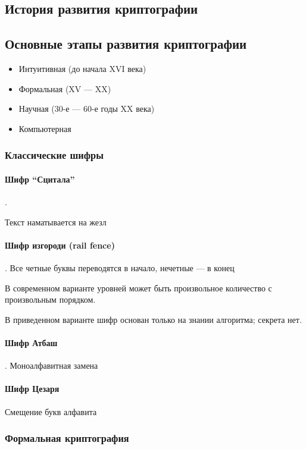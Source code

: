 \documentclass[a4paper, 14pt]{extarticle}
\begin{document}
\subsection{История развития криптографии}
\subsection{Основные этапы развития криптографии}
\begin{itemize}
    \item Интуитивная (до начала XVI века)
    \item Формальная (XV --- XX)
    \item Научная (30-е --- 60-е годы XX века)
    \item Компьютерная
\end{itemize}


\subsubsection{Классические шифры}
\paragraph{Шифр ``Сцитала''}.

Текст наматывается на жезл

\paragraph{Шифр изгороди (rail fence)}. Все четные буквы переводятся в начало, нечетные --- в конец

В современном варианте уровней может быть произвольное количество с произвольным порядком.

В приведенном варианте шифр основан только на знании алгоритма; секрета нет.

\paragraph{Шифр Атбаш}. Моноалфавитная замена

\paragraph{Шифр Цезаря}
Смещение букв алфавита

\subsubsection{Формальная криптография}
\end{document}
